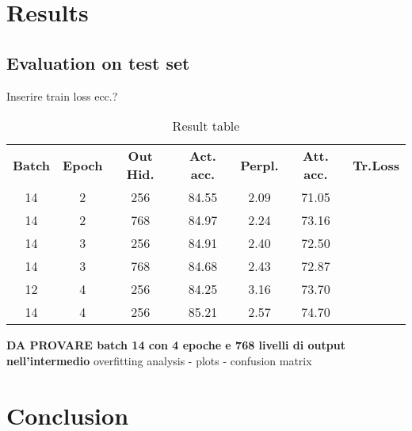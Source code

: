 \documentclass[final]{cvpr}
\begin{document}
	\section{Results}
	
	\subsection{Evaluation on test set}
	Inserire train loss ecc.?
	
	\begin{table}[h]
		\centering
	
		\begin{tabular}{ccccccc}
			\rowcolor[gray]{0.5}
			\textbf{Batch} & \textbf{Epoch} & \textbf{Out Hid.} & \textbf{Act. acc.} & \textbf{Perpl.} & \textbf{Att. acc.} & \textbf{Tr.Loss} \\
			\rowcolor[gray]{0.9}
			14 & 2 & 256 & 84.55 & 2.09 & 71.05 & \\
			\rowcolor[gray]{0.97}
			14 & 2 & 768 & 84.97 & 2.24 & 73.16 & \\
			\rowcolor[gray]{0.9}
			14 & 3 & 256 & 84.91 & 2.40 & 72.50 & \\
			\rowcolor[gray]{0.97}
			14 & 3 & 768 & 84.68 & 2.43 & 72.87 & \\
			\rowcolor[gray]{0.9}
			12 & 4 & 256 & 84.25 & 3.16 & 73.70 & \\
			\rowcolor[gray]{0.97}
			14 & 4 & 256 & 85.21 & 2.57 & 74.70 & \\
		\end{tabular}
	
		\caption{\small{Result table}}
		\label{tab:sentcomp}
	\end{table}

	\textbf{DA PROVARE batch 14 con 4 epoche e 768 livelli di output nell'intermedio} \newline
	overfitting analysis - plots - confusion matrix
	\section{Conclusion}
	
	
	{\small
		
		
	}
	
\end{document}
